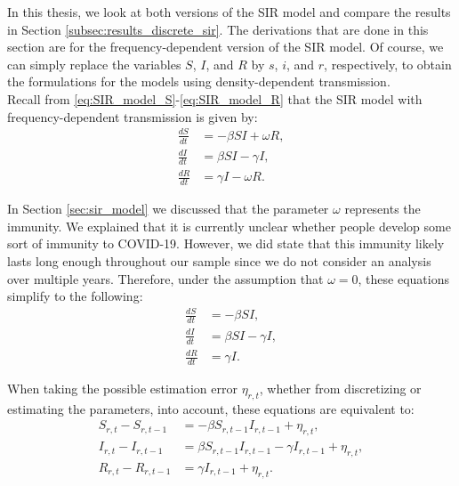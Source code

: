 \documentclass[12pt]{article}
\begin{document}
	In this thesis, we look at both versions of the SIR model and compare the results in Section \ref{subsec:results_discrete_sir}. The derivations that are done in this section are for the frequency-dependent version of the SIR model. Of course, we can simply replace the variables $S$, $I$, and $R$ by $s$, $i$, and $r$, respectively, to obtain the formulations for the models using density-dependent transmission. \\
	
	Recall from \eqref{eq:SIR_model_S}-\eqref{eq:SIR_model_R} that the SIR model with frequency-dependent transmission is given by:
	    \begin{align*}
    	    \frac{dS}{dt} &= -\beta SI + \omega R, \\
    	    \frac{dI}{dt} &= \beta SI - \gamma I, \\
    	    \frac{dR}{dt} &= \gamma I - \omega R.
	    \end{align*}
	
	In Section \ref{sec:sir_model} we discussed that the parameter $\omega$ represents the immunity. We explained that it is currently unclear whether people develop some sort of immunity to COVID-19. However, we did state that this immunity likely lasts long enough throughout our sample since we do not consider an analysis over multiple years. Therefore, under the assumption that $\omega = 0$, these equations simplify to the following:
	    \begin{align}
    	    \frac{dS}{dt} &= -\beta SI, \label{eq:SIR_model_S_simplified} \\
    	    \frac{dI}{dt} &= \beta SI - \gamma I, \label{eq:SIR_model_I_simplified} \\
    	    \frac{dR}{dt} &= \gamma I. \label{eq:SIR_model_R_simplified}
	    \end{align}
    	
	When taking the possible estimation error $\eta_{r,t}$, whether from discretizing or estimating the parameters, into account, these equations are equivalent to:
	    \begin{align}
        	S_{r,t} - S_{r,t-1} &= -\beta S_{r,t-1}I_{r,t-1} + \eta_{r,t}, \label{eq:SIR_model_S_discrete}\\
        	I_{r,t} - I_{r,t-1} &= \beta S_{r,t-1}I_{r,t-1} - \gamma I_{r,t-1} + \eta_{r,t}, \label{eq:SIR_model_I_discrete}\\
        	R_{r,t} - R_{r,t-1} &= \gamma I_{r,t-1} + \eta_{r,t}. \label{eq:SIR_model_R_discrete}
    	\end{align}
	
\end{document}
